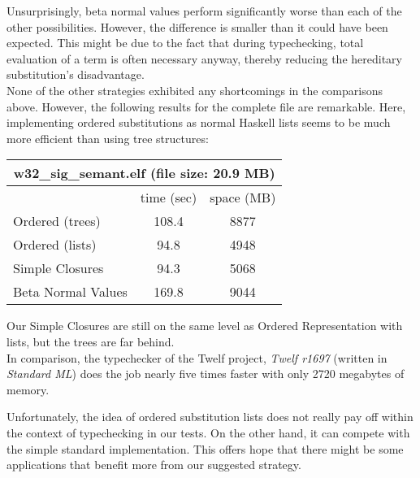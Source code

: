 \documentclass[12pt, a4paper, titlepage]{article}
\begin{document}
Unsurprisingly, beta normal values perform significantly worse than each of the other possibilities. However, the difference is smaller than it could have been expected. This might be due to the fact that during typechecking, total evaluation of a term is often necessary anyway, thereby reducing the hereditary substitution's disadvantage. \\
None of the other strategies exhibited any shortcomings in the comparisons above. However, the following results for the complete file are remarkable. Here, implementing ordered substitutions as normal Haskell lists seems to be much more efficient than using tree structures: 
\begin{center}
 \begin{tabular}{| l || c | c |}
\multicolumn{3}{c}{\textsf{w32\_sig\_semant.elf} (file size: 20.9 MB)}\\
\hline
& time (sec) & space (MB) \\
\hline
\hline
Ordered (trees) & 108.4 & 8877\\
\hline
Ordered (lists) & 94.8 & 4948\\ %
\hline
Simple Closures & 94.3 & 5068 \\ %
\hline
Beta Normal Values & 169.8 & 9044  \\
\hline
\end{tabular}
\end{center}
Our Simple Closures are still on the same level as Ordered Representation with lists, but the trees are far behind. 
\\
In comparison, the typechecker of the Twelf project, \emph{Twelf r1697} (written in \emph{Standard ML}) does the job nearly five times faster with only 2720 megabytes of memory.

Unfortunately, the idea of ordered substitution lists does not really pay off within the context of typechecking in our tests. 
On the other hand, it can compete with the simple standard implementation. This offers hope that there might be some applications that benefit more from our suggested strategy. 


\clearpage
\end{document}
